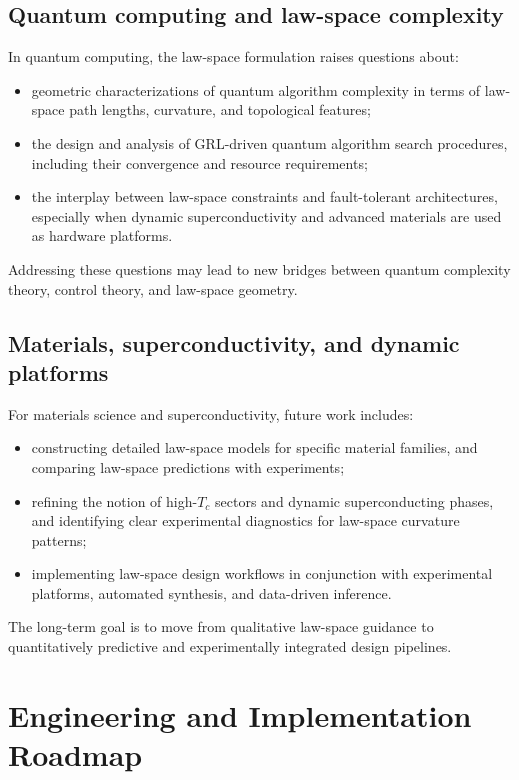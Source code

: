 \documentclass[11pt]{book}
\theoremstyle{plain}
\theoremstyle{definition}
\theoremstyle{remark}
\begin{document}
\subsection*{Quantum computing and law-space complexity}

In quantum computing, the law-space formulation raises questions
about:
\begin{itemize}
  \item geometric characterizations of quantum algorithm complexity
        in terms of law-space path lengths, curvature, and
        topological features;
  \item the design and analysis of GRL-driven quantum algorithm
        search procedures, including their convergence and resource
        requirements;
  \item the interplay between law-space constraints and fault-tolerant
        architectures, especially when dynamic superconductivity and
        advanced materials are used as hardware platforms.
\end{itemize}

Addressing these questions may lead to new bridges between quantum
complexity theory, control theory, and law-space geometry.

\subsection*{Materials, superconductivity, and dynamic platforms}

For materials science and superconductivity, future work includes:
\begin{itemize}
  \item constructing detailed law-space models for specific material
        families, and comparing law-space predictions with experiments;
  \item refining the notion of high-$T_c$ sectors and dynamic
        superconducting phases, and identifying clear experimental
        diagnostics for law-space curvature patterns;
  \item implementing law-space design workflows in conjunction with
        experimental platforms, automated synthesis, and data-driven
        inference.
\end{itemize}

The long-term goal is to move from qualitative law-space guidance to
quantitatively predictive and experimentally integrated design
pipelines.

\section*{Engineering and Implementation Roadmap}
\end{document}
